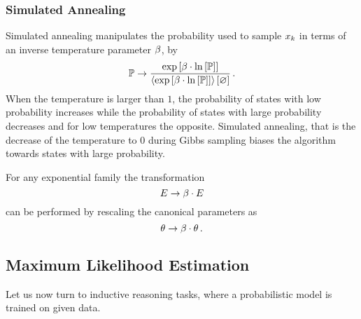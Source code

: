 



\subsubsection{Simulated Annealing}


	Simulated annealing manipulates the probability used to sample $x_{k}$ in terms of an inverse temperature parameter $\beta$, by
		\[ \mathbb{P} \rightarrow \frac{\mathrm{exp}\left[\beta\cdot\ln \left[ \mathbb{P} \right]\right]}{\left\langle \mathrm{exp}\left[\beta\cdot\ln \left[ \mathbb{P} \right]\right]\right\rangle \left[ \varnothing \right] } \, . \]
	When the temperature is larger than $1$, the probability of states with low probability increases while the probability of states with large probability decreases and for low temperatures the opposite.
	Simulated annealing, that is the decrease of the temperature to $0$ during Gibbs sampling biases the algorithm towards states with large probability.

	For any exponential family the transformation 
		\[ E \rightarrow \beta \cdot E  \]
	can be performed by rescaling the canonical parameters as
		\[ \theta \rightarrow \beta \cdot \theta \, . \]







\subsection{Maximum Likelihood Estimation} %

Let us now turn to inductive reasoning tasks, where a probabilistic model is trained on given data.

